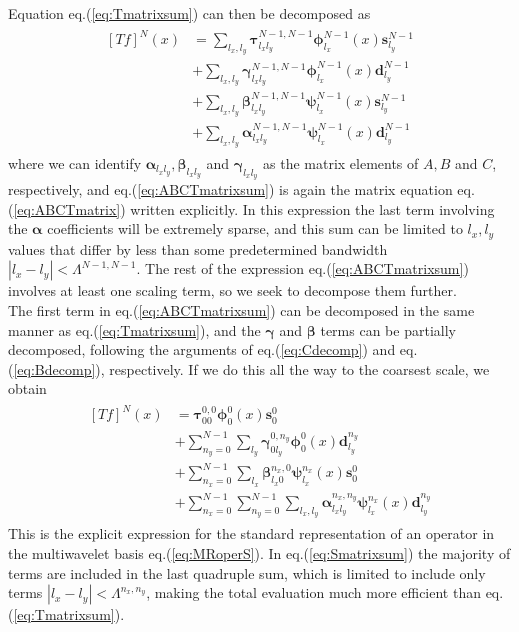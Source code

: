 Equation eq.(\ref{eq:Tmatrixsum}) can then be decomposed as
\begin{align}
	\label{eq:ABCTmatrixsum}
	\begin{split}
	[Tf]^N(x) &= \sum_{l_x,l_y}\boldsymbol{\tau}^{N-1,N-1}_{l_xl_y}
	\boldsymbol{\phi}^{N-1}_{l_x}(x) \boldsymbol{s}^{N-1}_{l_y}\\
	&+ \sum_{l_x,l_y}\boldsymbol{\gamma}^{N-1,N-1}_{l_xl_y}
	\boldsymbol{\phi}^{N-1}_{l_x}(x) \boldsymbol{d}^{N-1}_{l_y}\\
	&+ \sum_{l_x,l_y}\boldsymbol{\beta}^{N-1,N-1}_{l_xl_y}
	\boldsymbol{\psi}^{N-1}_{l_x}(x) \boldsymbol{s}^{N-1}_{l_y}\\
	&+ \sum_{l_x,l_y}\boldsymbol{\alpha}^{N-1,N-1}_{l_xl_y}
	\boldsymbol{\psi}^{N-1}_{l_x}(x) \boldsymbol{d}^{N-1}_{l_y}
	\end{split}
\end{align}
where we can identify $\boldsymbol{\alpha}_{l_xl_y}, 
\boldsymbol{\beta}_{l_xl_y}$ and 
$\boldsymbol{\gamma}_{l_xl_y}$ as the matrix elements of $A, B$ and
$C$, respectively, and eq.(\ref{eq:ABCTmatrixsum}) is again the matrix equation
eq.(\ref{eq:ABCTmatrix}) written explicitly. In this expression the last term
involving the $\boldsymbol{\alpha}$ coefficients will be extremely sparse, and 
this sum can be limited to $l_x,l_y$ values that differ by less than some 
predetermined bandwidth $|l_x-l_y| < \Lambda^{N-1,N-1}$. The rest of the 
expression eq.(\ref{eq:ABCTmatrixsum}) involves at least one scaling term, so
we seek to decompose them further.\\

\noindent
The first term in eq.(\ref{eq:ABCTmatrixsum}) can be decomposed in the same
manner as eq.(\ref{eq:Tmatrixsum}), and the $\boldsymbol{\gamma}$ and
$\boldsymbol{\beta}$ terms can be partially decomposed, following the
arguments of eq.(\ref{eq:Cdecomp}) and eq.(\ref{eq:Bdecomp}), respectively. If we do 
this all the way to the coarsest scale, we obtain
\begin{align}
	\label{eq:Smatrixsum}
	\begin{split}
	[Tf]^N(x) &= \boldsymbol{\tau}^{0,0}_{00}
	\boldsymbol{\phi}^{0}_{0}(x) \boldsymbol{s}^{0}_{0}\\
	&+ \sum_{n_y=0}^{N-1}\sum_{l_y}
	\boldsymbol{\gamma}^{0,n_y}_{0l_y}
	\boldsymbol{\phi}^{0}_{0}(x) \boldsymbol{d}^{n_y}_{l_y}\\
	&+ \sum_{n_x=0}^{N-1}\sum_{l_x}
	\boldsymbol{\beta}^{n_x,0}_{l_x0}\boldsymbol{\psi}^{n_x}_{l_x}(x) 
	\boldsymbol{s}^{0}_{0}\\
	&+ \sum_{n_x=0}^{N-1}\sum_{n_y=0}^{N-1}\sum_{l_x,l_y}
	\boldsymbol{\alpha}^{n_x,n_y}_{l_xl_y} \boldsymbol{\psi}^{n_x}_{l_x}(x) 
	\boldsymbol{d}^{n_y}_{l_y}
	\end{split}
\end{align}
This is the explicit expression for the standard representation of an operator
in the multiwavelet basis eq.(\ref{eq:MRoperS}). In eq.(\ref{eq:Smatrixsum}) the 
majority of terms are included in the last quadruple sum, which is limited to 
include only terms $|l_x-l_y| < \Lambda^{n_x,n_y}$, making the total evaluation
much more efficient than eq.(\ref{eq:Tmatrixsum}). 


